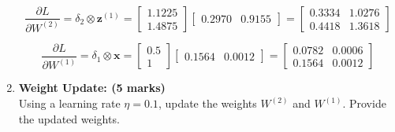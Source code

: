 \documentclass[12pt]{article}
\begin{document}
\begin{enumerate}[font=\Large]
$$\begin{aligned}
		      \end{aligned}
	      $$
	      $$\dfrac{\partial L}{\partial W^{(2)}}=\delta_2\otimes\mathbf{z}^{(1)}=\begin{bmatrix} 1.1225 \\ 1.4875 \end{bmatrix}\begin{bmatrix} 0.2970 & 0.9155 \end{bmatrix}=\begin{bmatrix} 0.3334 & 1.0276\\ 0.4418 & 1.3618 \end{bmatrix}$$

	      $$\dfrac{\partial L}{\partial W^{(1)}}=\delta_1\otimes\mathbf{x}=\begin{bmatrix} 0.5 \\ 1 \end{bmatrix}\begin{bmatrix} 0.1564 & 0.0012 \end{bmatrix}=\begin{bmatrix} 0.0782 & 0.0006\\ 0.1564 & 0.0012 \end{bmatrix}$$
	\item \textbf{Weight Update: (5 marks)}\\
	      Using a learning rate $\eta=0.1$, update the weights $W^{(2)}$ and $W^{(1)}$. Provide the updated weights.

\end{enumerate}
\end{document}

